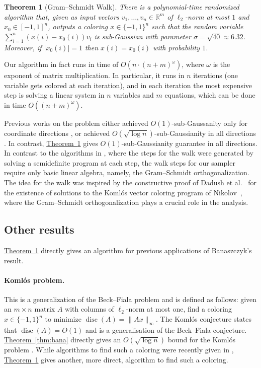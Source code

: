 \documentclass[11pt]{article}
\numberwithin{equation}{section}
\newtheorem{theorem}{Theorem}[section]
\theoremstyle{definition}
\theoremstyle{plain}
\newcommand{\expref}[2]{\hyperref[#2]{#1~\ref{#2}}}
\DeclareMathOperator{\disc}{disc}   %
\begin{document}
\begin{theorem}[Gram--Schmidt Walk]
\label{thm:main}
There is a polynomial-time randomized algorithm that, given as input vectors $v_1,\dots,v_n\in\mathbb{R}^m$ of $\ell_2$-norm at most $1$ and $x_0\in [-1,1]^n$, outputs a coloring $x\in\{-1,1\}^n$ such that
the random variable $\sum_{i=1}^n (x(i)-x_0(i))v_i$ is sub-Gaussian with
parameter $\sigma = \sqrt{40} \approx 6.32$. Moreover, if $|x_0(i)|=1$ then $x(i) = x_0(i)$ with probability $1$.
\end{theorem}


Our algorithm in fact runs in time of $O(n \cdot (n+m)^{\omega})$, where
$\omega$ is the exponent of matrix multiplication.  In particular, it runs in
$n$ iterations (one variable gets colored at each iteration), and in each iteration
the most expensive step is solving a linear system in $n$ variables and $m$
equations, which can be done in time $O((n+m)^{\omega})$.

Previous works on the problem either
achieved $O(1)$-sub-Gaussanity only for coordinate directions \cite{BDG16,BG17},
or achieved
$O(\sqrt{\log n})$-sub-Gaussianity in all directions \cite{DGLN16}. In contrast, \expref{Theorem}{thm:main} gives $O(1)$-sub-Gaussianity guarantee in all directions.
In contrast to the algorithms in \cite{BDG16,BG17}, where the steps for the walk were generated by solving a semidefinite program at each step, the walk
steps for our sampler require only basic linear algebra, namely, the Gram--Schmidt orthogonalization.
The idea for the walk was inspired by the constructive
proof of Dadush et al.~\cite{DGLN16} for the existence of solutions to the Koml{\'o}s vector
coloring program of Nikolov~\cite{N13}, where the Gram--Schmidt orthogonalization
plays a crucial role in the analysis.

\subsection{Other results}
\label{sec:introapp}
\expref{Theorem}{thm:main} directly gives an algorithm for previous applications of Banaszczyk's result.

\paragraph{Koml\'{o}s problem.} This is a generalization of the Beck--Fiala problem and is defined as follows: given an $m\times n$ matrix $A$ with columns of $\ell_2$-norm at most one, find a coloring $x\in\{-1,1\}^n$ to minimize $\disc(A)=\| Ax\|_\infty$.
The Koml\'{o}s conjecture \cite{spencerbook} states that $\disc(A)=O(1)$ and is a generalisation of the Beck--Fiala conjecture.
%
\expref{Theorem}{thm:bana} directly gives an $O(\sqrt{\log n})$ bound for the Koml\'{o}s problem \cite{B97}. While algorithms to find such a coloring were recently given in \cite{BDG16,BG17,harish17}, \expref{Theorem}{thm:main} gives another, more direct, algorithm to find such a coloring.
\end{document}
